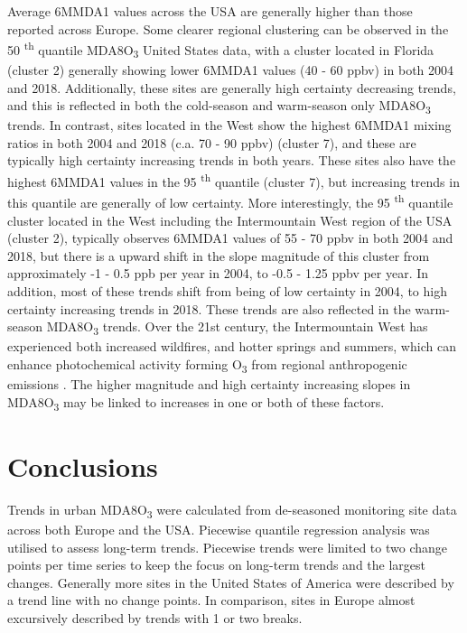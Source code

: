 \documentclass[journal abbreviation, manuscript]{copernicus}
\begin{document}
Average 6MMDA1 values across the USA are generally higher than those reported across Europe. Some clearer regional clustering can be observed in the 50 \textsuperscript{th} quantile MDA8O\textsubscript{3} United States data, with a cluster located in Florida (cluster 2) generally showing lower 6MMDA1 values (40 - 60 ppbv) in both 2004 and 2018. Additionally, these sites are generally high certainty decreasing trends, and this is reflected in both the cold-season and warm-season only MDA8O\textsubscript{3} trends. In contrast, sites located in the West show the highest 6MMDA1 mixing ratios in both 2004 and 2018 (c.a. 70 - 90 ppbv) (cluster 7), and these are typically high certainty increasing trends in both years. These sites also have the highest 6MMDA1 values in the 95 \textsuperscript{th} quantile (cluster 7), but increasing trends in this quantile are generally of low certainty. More interestingly, the 95 \textsuperscript{th} quantile cluster located in the West including the Intermountain West region of the USA (cluster 2), typically observes 6MMDA1 values of 55 - 70 ppbv in both 2004 and 2018, but there is a upward shift in the slope magnitude of this cluster from approximately -1 - 0.5 ppb per year in 2004, to -0.5 - 1.25 ppbv per year. In addition, most of these trends shift from being of low certainty in 2004, to high certainty increasing trends in 2018. These trends are also reflected in the warm-season MDA8O\textsubscript{3} trends. Over the 21st century, the Intermountain West has experienced both increased wildfires, and hotter springs and summers, which can enhance photochemical activity forming O\textsubscript{3} from regional anthropogenic emissions \citep{Lin2017, Li2021, Peterson2021, Iglesias2022}. The higher magnitude and high certainty increasing slopes in MDA8O\textsubscript{3} may be linked to increases in one or both of these factors.

\section{Conclusions}  %

Trends in urban MDA8O\textsubscript{3} were calculated from de-seasoned monitoring site data across both Europe and the USA. Piecewise quantile regression analysis was utilised to assess long-term trends. Piecewise trends were limited to two change points per time series to keep the focus on long-term trends and the largest changes. Generally more sites in the United States of America were described by a trend line with no change points. In comparison, sites in Europe almost excursively described by trends with 1 or two breaks. 
\end{document}
